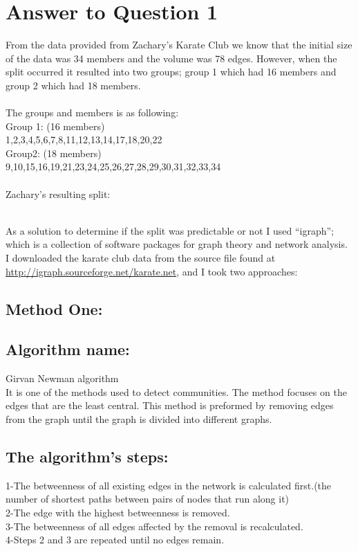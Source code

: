 \documentclass[letterpaper,11pt]{article}
\begin{document}
\section*{Answer to Question 1}
From the data provided from Zachary’s Karate Club we know that the initial size of the data was 34 members and the volume was 78 edges. However, when the split occurred it resulted into two groups; group 1 which had 16 members and group 2 which had 18 members.
\\
\\
The groups and members is as following:\\
Group 1: (16 members)\\
1,2,3,4,5,6,7,8,11,12,13,14,17,18,20,22\\
Group2: (18 members)\\
9,10,15,16,19,21,23,24,25,26,27,28,29,30,31,32,33,34\\\
\\
Zachary’s resulting split:\\

\noindent
\begin{minipage}{\linewidth}
\label{visina8}
\end{minipage}
\\
As a solution to determine if the split was predictable or not I used “igraph”; which is a collection of software packages for graph theory and network analysis. I downloaded the karate club data from the source file found at \url{http://igraph.sourceforge.net/karate.net}, and I took two approaches:
\subsection{ \huge Method One:}
\subsection*{ Algorithm name:}
Girvan Newman algorithm\\
It is one of the methods used to detect communities. The method focuses on the edges that are the least central. This method is preformed by removing edges from the graph until the graph is divided into different graphs.

\subsection*{The algorithm's steps:}
1-The betweenness of all existing edges in the network is calculated first.(the number of shortest paths between pairs of nodes that run along it)\\
2-The edge with the highest betweenness is removed.\\
3-The betweenness of all edges affected by the removal is recalculated.\\
4-Steps 2 and 3 are repeated until no edges remain.
\end{document}
